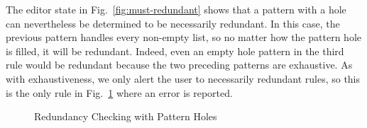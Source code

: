 The editor state in Fig.~\ref{fig:must-redundant} shows that a pattern with a hole can nevertheless be determined to be necessarily redundant.
In this case, the previous pattern handles every non-empty list, so no matter how the pattern hole is filled, it will be redundant.
Indeed, even an empty hole pattern in the third rule would be redundant because the two preceding patterns are exhaustive.
 As with exhaustiveness, we only alert
the user to necessarily redundant rules, so this is the only rule in Fig.~\ref{fig:redundancy} where an error is reported.

\begin{figure}
  \centering
    \hfill
  \caption{Redundancy Checking with Pattern Holes}
  \label{fig:redundancy}
\end{figure}


